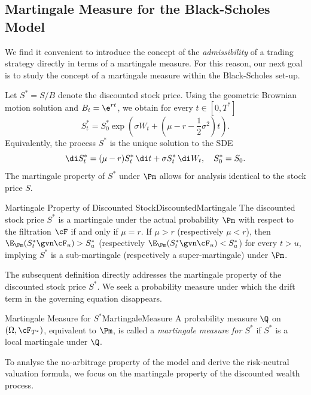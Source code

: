 \subsection{Martingale Measure for the Black-Scholes Model}
We find it convenient to introduce the concept of the \textit{admissibility} of a trading strategy directly in terms of a martingale measure. For this reason, our next goal is to study the concept of a martingale measure within the Black-Scholes set-up.

Let $S^* = S/B$ denote the discounted stock price. Using the geometric Brownian motion solution  and $B_t = \e^{rt}$, we obtain for every $t \in [0, T^*]$
\begin{equation}
	S^*_t = S^*_0 \exp\left(\sigma W_t + \left(\mu - r - \frac{1}{2}\sigma^2\right) t\right).
	\label{eq:DiscountedGBMSolution}
\end{equation}
Equivalently, the process $S^*$ is the unique solution to the SDE
\begin{equation}
	\di S^*_t = (\mu - r) S^*_t \, \di t + \sigma S^*_t \, \di W_t, \quad S^*_0 = S_0.
	\label{eq:DiscountedSDE}
\end{equation}
The martingale property of $S^*$ under $\Pm$ allows for analysis identical to the stock price $S$.
\begin{cor}{Martingale Property of Discounted Stock}{DiscountedMartingale}
	The discounted stock price $S^*$ is a martingale under the actual probability $\Pm$ with respect to the filtration $\cF$ if and only if $\mu = r$. If $\mu > r$ (respectively $\mu < r$), then $\E_{\Pm}(S^*_t \gvn \cF_u) > S^*_u$ (respectively $\E_{\Pm}(S^*_t \gvn \cF_u) < S^*_u$) for every $t > u$, implying $S^*$ is a sub-martingale (respectively a super-martingale) under $\Pm$.
\end{cor}

The subsequent definition directly addresses the martingale property of the discounted stock price $S^*$. We seek a probability measure under which the drift term in the governing equation  disappears.

\begin{defn}{Martingale Measure for $S^*$}{MartingaleMeasure}
	A probability measure $\Q$ on $(\Omega, \cF_{T^*})$, equivalent to $\Pm$, is called a \textit{martingale measure for $S^*$} if $S^*$ is a local martingale under $\Q$.
\end{defn}

To analyse the no-arbitrage property of the model and derive the risk-neutral valuation formula, we focus on the martingale property of the discounted wealth process.

